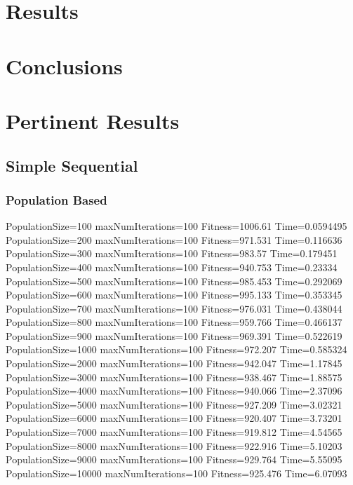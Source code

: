 \documentclass[10pt,letterpaper]{article}
\begin{document}
\section{Results}

\section{Conclusions}


\section{Pertinent Results}
\subsection{Simple Sequential}
\subsubsection{Population Based}
PopulationSize=100 maxNumIterations=100 Fitness=1006.61 Time=0.0594495
PopulationSize=200 maxNumIterations=100 Fitness=971.531 Time=0.116636
PopulationSize=300 maxNumIterations=100 Fitness=983.57 Time=0.179451
PopulationSize=400 maxNumIterations=100 Fitness=940.753 Time=0.23334
PopulationSize=500 maxNumIterations=100 Fitness=985.453 Time=0.292069
PopulationSize=600 maxNumIterations=100 Fitness=995.133 Time=0.353345
PopulationSize=700 maxNumIterations=100 Fitness=976.031 Time=0.438044
PopulationSize=800 maxNumIterations=100 Fitness=959.766 Time=0.466137
PopulationSize=900 maxNumIterations=100 Fitness=969.391 Time=0.522619
PopulationSize=1000 maxNumIterations=100 Fitness=972.207 Time=0.585324
PopulationSize=2000 maxNumIterations=100 Fitness=942.047 Time=1.17845
PopulationSize=3000 maxNumIterations=100 Fitness=938.467 Time=1.88575
PopulationSize=4000 maxNumIterations=100 Fitness=940.066 Time=2.37096
PopulationSize=5000 maxNumIterations=100 Fitness=927.209 Time=3.02321
PopulationSize=6000 maxNumIterations=100 Fitness=920.407 Time=3.73201
PopulationSize=7000 maxNumIterations=100 Fitness=919.812 Time=4.54565
PopulationSize=8000 maxNumIterations=100 Fitness=922.916 Time=5.10203
PopulationSize=9000 maxNumIterations=100 Fitness=929.764 Time=5.55095
PopulationSize=10000 maxNumIterations=100 Fitness=925.476 Time=6.07093
\end{document}
